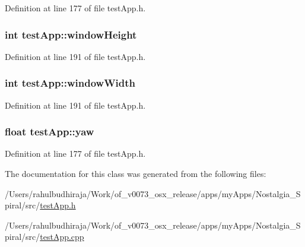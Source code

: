 Definition at line 177 of file test\-App.\-h.

\hypertarget{classtest_app_a4e8884eeef5b2657b62278969d4e3dcf}{
\subsubsection[{window\-Height}]{\setlength{\rightskip}{0pt plus 5cm}int test\-App\-::window\-Height}}\label{classtest_app_a4e8884eeef5b2657b62278969d4e3dcf}


Definition at line 191 of file test\-App.\-h.

\hypertarget{classtest_app_a9ed611377cd46f5148a3a3d538e96484}{
\subsubsection[{window\-Width}]{\setlength{\rightskip}{0pt plus 5cm}int test\-App\-::window\-Width}}\label{classtest_app_a9ed611377cd46f5148a3a3d538e96484}


Definition at line 191 of file test\-App.\-h.

\hypertarget{classtest_app_a865985f78dd5def3ed20c87b9fc772b6}{
\subsubsection[{yaw}]{\setlength{\rightskip}{0pt plus 5cm}float test\-App\-::yaw}}\label{classtest_app_a865985f78dd5def3ed20c87b9fc772b6}


Definition at line 177 of file test\-App.\-h.



The documentation for this class was generated from the following files\-:\begin{DoxyCompactItemize}
\item 
/\-Users/rahulbudhiraja/\-Work/of\-\_\-v0073\-\_\-osx\-\_\-release/apps/my\-Apps/\-Nostalgia\-\_\-\-Spiral/src/\hyperlink{test_app_8h}{test\-App.\-h}\item 
/\-Users/rahulbudhiraja/\-Work/of\-\_\-v0073\-\_\-osx\-\_\-release/apps/my\-Apps/\-Nostalgia\-\_\-\-Spiral/src/\hyperlink{test_app_8cpp}{test\-App.\-cpp}\end{DoxyCompactItemize}
